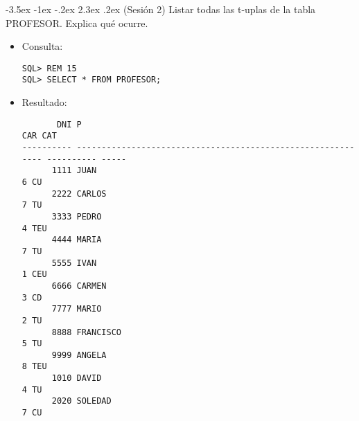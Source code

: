\documentclass[11pt]{report}
\makeatletter
\renewcommand\chapter{\@startsection{chapter}{0}{\z@}%
    {-3.5ex \@plus -1ex \@minus -.2ex}%
    {2.3ex \@plus.2ex}%
    {\normalfont\Large\bfseries}}
\makeatother
\begin{document}
\chapter{(Sesión 2) Listar todas las t-uplas de la tabla PROFESOR. Explica qué ocurre.}
\begin{itemize}
  \item Consulta:
  \begin{verbatim}
SQL> REM 15
SQL> SELECT * FROM PROFESOR;
  \end{verbatim}
  \item{Resultado:}
  \begin{verbatim}
       DNI P                                                                   CAR CAT                                                                                                                  
---------- ------------------------------------------------------------ ---------- -----                                                                                                                
      1111 JUAN                                                                  6 CU                                                                                                                   
      2222 CARLOS                                                                7 TU                                                                                                                   
      3333 PEDRO                                                                 4 TEU                                                                                                                  
      4444 MARIA                                                                 7 TU                                                                                                                   
      5555 IVAN                                                                  1 CEU                                                                                                                  
      6666 CARMEN                                                                3 CD                                                                                                                   
      7777 MARIO                                                                 2 TU                                                                                                                   
      8888 FRANCISCO                                                             5 TU                                                                                                                   
      9999 ANGELA                                                                8 TEU                                                                                                                  
      1010 DAVID                                                                 4 TU                                                                                                                   
      2020 SOLEDAD                                                               7 CU                                                                                                                   


\end{verbatim}
\end{itemize}
\end{document}
